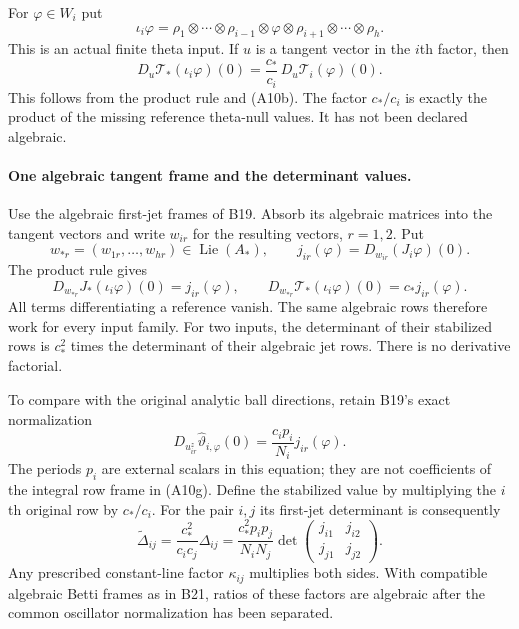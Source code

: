 For $\varphi\in W_i$ put
\[
 \iota_i\varphi=
       \rho_1\otimes\cdots\otimes\rho_{i-1}
            \otimes\varphi\otimes
           \rho_{i+1}\otimes\cdots\otimes\rho_h.
 \tag{A10e}
\]
This is an actual finite theta input.  If $u$ is a tangent
vector in the $i$th factor, then
\[
 D_u\mathcal T_*(\iota_i\varphi)(0)
       =\frac{c_*}{c_i}\,D_u\mathcal T_i(\varphi)(0).
 \tag{A10f}
\]
This follows from the product rule and (A10b).  The factor
$c_*/c_i$ is exactly the product of the missing reference
theta-null values.  It has not been declared algebraic.

\paragraph{One algebraic tangent frame and the determinant values.}
Use the algebraic first-jet frames of B19.  Absorb its
algebraic matrices into the tangent vectors and write
$w_{ir}$ for the resulting vectors, $r=1,2$.  Put
\[
 w_{*r}=(w_{1r},\ldots,w_{hr})\in\operatorname{Lie}(A_*),
 \qquad
 j_{ir}(\varphi)=D_{w_{ir}}(J_i\varphi)(0).
 \tag{A10g}
\]
The product rule gives
\[
 D_{w_{*r}}J_*(\iota_i\varphi)(0)=j_{ir}(\varphi),
 \qquad
 D_{w_{*r}}\mathcal T_*(\iota_i\varphi)(0)
                                     =c_*j_{ir}(\varphi).
 \tag{A10h}
\]
All terms differentiating a reference vanish.  The same
algebraic rows therefore work for every input family.
For two inputs, the determinant of their stabilized rows is
$c_*^2$ times the determinant of their algebraic jet rows.
There is no derivative factorial.

To compare with the original analytic ball directions, retain
B19's exact normalization
\[
  D_{u^z_{ir}}\widehat\vartheta_{i,\varphi}(0)
          =\frac{c_ip_i}{N_i}j_{ir}(\varphi).
 \tag{A10i}
\]
The periods $p_i$ are external scalars in this equation;
they are not coefficients of the integral row frame in
(A10g).  Define the stabilized value by multiplying the
$i$th original row by $c_*/c_i$.  For the pair $i,j$ its
first-jet determinant is consequently
\[
 \widetilde\Delta_{ij}
   =\frac{c_*^2}{c_ic_j}\Delta_{ij}
   =\frac{c_*^2p_ip_j}{N_iN_j}
       \det\begin{pmatrix}j_{i1}&j_{i2}\\j_{j1}&j_{j2}\end{pmatrix}.
 \tag{A10j}
\]
Any prescribed constant-line factor $\kappa_{ij}$ multiplies
both sides.  With compatible algebraic Betti frames as in
B21, ratios of these factors are algebraic after the common
oscillator normalization has been separated.


